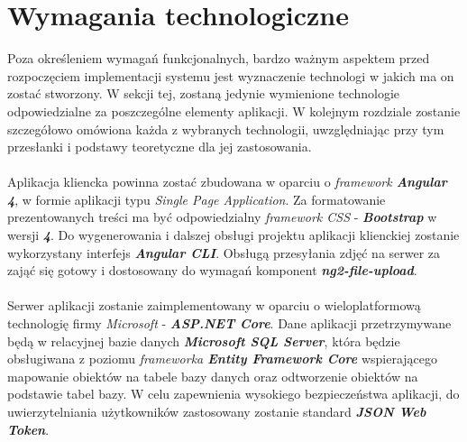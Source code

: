 \section{Wymagania technologiczne}
\quad Poza określeniem wymagań funkcjonalnych, bardzo ważnym aspektem przed rozpoczęciem implementacji systemu jest wyznaczenie technologi w jakich ma on zostać stworzony. W sekcji tej, zostaną jedynie wymienione technologie odpowiedzialne za poszczególne elementy aplikacji. W kolejnym rozdziale zostanie szczegółowo omówiona każda z wybranych technologii, uwzględniając przy tym przesłanki i podstawy teoretyczne dla jej zastosowania.\\
\\
Aplikacja kliencka powinna zostać zbudowana w oparciu o \textit{framework \textbf{Angular 4}}, w formie aplikacji typu \textit{Single Page Application}. Za formatowanie prezentowanych treści ma być odpowiedzialny \textit{framework CSS} - \textit{\textbf{Bootstrap}} w wersji \textit{\textbf{4}}. Do wygenerowania i dalszej obsługi projektu aplikacji klienckiej zostanie wykorzystany interfejs \textit{\textbf{Angular CLI}}. Obsługą przesyłania zdjęć na serwer za zająć się gotowy i dostosowany do wymagań komponent \textit{\textbf{ng2-file-upload}}.\\
\\
Serwer aplikacji zostanie zaimplementowany w oparciu o wieloplatformową technologię firmy \textit{Microsoft} - \textit{\textbf{ASP.NET Core}}. Dane aplikacji przetrzymywane będą w relacyjnej bazie danych \textit{\textbf{Microsoft SQL Server}}, która będzie obsługiwana z poziomu \textit{frameworka \textbf{Entity Framework Core}} wspierającego mapowanie obiektów na tabele bazy danych oraz odtworzenie obiektów na podstawie tabel bazy. W celu zapewnienia wysokiego bezpieczeństwa aplikacji, do uwierzytelniania użytkowników zastosowany zostanie standard \textit{\textbf{JSON Web Token}}.
